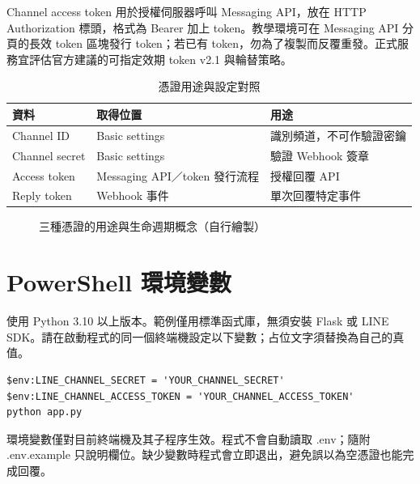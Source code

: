 \documentclass[12pt,a4paper]{report}
\begin{document}
Channel access token 用於授權伺服器呼叫 Messaging API，放在 HTTP Authorization 標頭，格式為 Bearer 加上 token。教學環境可在 Messaging API 分頁的長效 token 區塊發行 token；若已有 token，勿為了複製而反覆重發。正式服務宜評估官方建議的可指定效期 token v2.1 與輪替策略。
\begin{table}[htbp]
\centering\caption{憑證用途與設定對照}\label{tab:credentials}
\begin{tabular}{p{35mm}p{46mm}p{52mm}}\toprule
資料 & 取得位置 & 用途\\\midrule
Channel ID & Basic settings & 識別頻道，不可作驗證密鑰\\
Channel secret & Basic settings & 驗證 Webhook 簽章\\
Access token & Messaging API／token 發行流程 & 授權回覆 API\\
Reply token & Webhook 事件 & 單次回覆特定事件\\\bottomrule
\end{tabular}
\end{table}

\begin{figure}[htbp]
\centering
{}
\caption{三種憑證的用途與生命週期概念（自行繪製）}\label{fig:credentials}
\end{figure}

\section{PowerShell 環境變數}
使用 Python 3.10 以上版本。範例僅用標準函式庫，無須安裝 Flask 或 LINE SDK。請在啟動程式的同一個終端機設定以下變數；占位文字須替換為自己的真值。
\begin{lstlisting}[caption={設定環境變數並啟動服務},label={lst:start}]
$env:LINE_CHANNEL_SECRET = 'YOUR_CHANNEL_SECRET'
$env:LINE_CHANNEL_ACCESS_TOKEN = 'YOUR_CHANNEL_ACCESS_TOKEN'
python app.py
\end{lstlisting}
環境變數僅對目前終端機及其子程序生效。程式不會自動讀取 .env；隨附 .env.example 只說明欄位。缺少變數時程式會立即退出，避免誤以為空憑證也能完成回覆。
\end{document}
